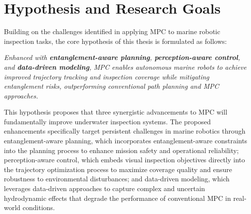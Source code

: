 


\section{Hypothesis and Research Goals}
Building on the challenges identified in applying \ac{MPC} to marine robotic inspection tasks, the core hypothesis of this thesis is formulated as follows:


    
\begin{center}
\begin{minipage}{1.0\textwidth}
\itshape
Enhanced with \textbf{entanglement-aware planning}, \textbf{perception-aware control}, and \textbf{data-driven modeling}, \ac{MPC} enables autonomous marine robots to achieve improved trajectory tracking and inspection coverage while mitigating entanglement risks, outperforming conventional path planning and \ac{MPC} approaches.
\end{minipage}
\end{center}

This hypothesis proposes that three synergistic advancements to \ac{MPC} will fundamentally improve underwater inspection systems. The proposed enhancements specifically target persistent challenges in marine robotics through entanglement-aware planning, which incorporates entanglement-aware constraints into the planning process to enhance mission safety and operational reliability; perception-aware control, which embeds visual inspection objectives directly into the trajectory optimization process to maximize coverage quality and ensure robustness to environmental disturbances; and data-driven modeling, which leverages data-driven approaches to capture complex and uncertain hydrodynamic effects that degrade the performance of conventional \ac{MPC} in real-world conditions.

